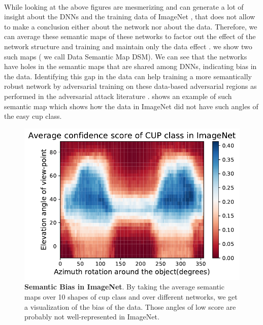 \label{sec:data-bias}\\
While looking at the above figures are mesmerizing and can generate a lot of insight about the DNNs and the training data of ImageNet \cite{IMAGENET}, that does not allow to make a conclusion either about the network nor about the data. Therefore, we can average these semantic maps of these networks to factor out the effect of the network structure and training and maintain only the data effect . we show two such maps ( we call Data Semantic Map DSM). We can see that the networks have holes in the semantic maps that are shared among DNNs, indicating bias in the data. Identifying this gap in the data can help training a more semantically robust network by adversarial training on these data-based adversarial regions as performed in the adversarial attack literature \cite{fast-sign}. \figLabel{} shows an example of such semantic map which shows how the data in ImageNet \cite{IMAGENET} did not have such angles of the easy cup class.


\begin{figure}[!t]
    \vspace{-8pt}
  \includegraphics[width=\columnwidth]{images/cup_Average.pdf}
  \vspace{-9pt}
  \caption{\small \textbf{Semantic Bias in ImageNet}. By taking the average semantic maps over 10 shapes of cup class and over different networks, we get a visualization of the bias of the data. Those angles of low score are probably not well-represented in ImageNet\cite{IMAGENET}.}
  \vspace{-10pt}
  \label{fig:2d-semantic}
\end{figure}
